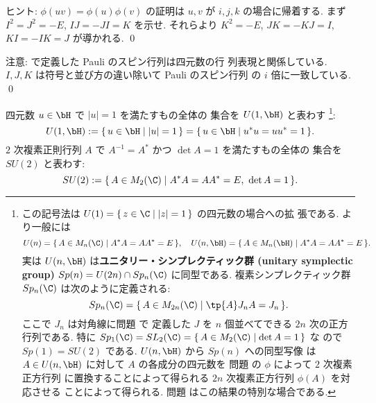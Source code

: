 \documentclass[12pt,twoside]{jarticle}
\begin{document}
\noindent
ヒント: $\phi(uv)=\phi(u)\phi(v)$ の証明は $u,v$ が $i,j,k$ の場合に帰着する. 
まず $I^2=J^2=-E$, $IJ=-JI=K$ を示せ.
それらより $K^2=-E$, $JK=-KJ=I$, $KI=-IK=J$ が導かれる.
\qed

\medskip
\noindent
注意:  で定義した Pauli のスピン行列は四元数の行
列表現と関係している.  $I,J,K$ は符号と並び方の違い除いて Pauli のスピン行列
の $i$ 倍に一致している.
\qed

\medskip

四元数 $u\in\bH$ で $|u|=1$ を満たすもの全体の
集合を $U(1,\bH)$ と表わす%
\footnote{この記号法は $U(1)=\{\,z\in\C\mid |z|=1 \,\}$ の四元数の場合への拡
  張である.  より一般には
  \begin{equation*}
    U(n) = \{\, A\in M_n(\C) \mid A^*A=AA^*=E \,\},
    \quad
    U(n,\bH) = \{\, A\in M_n(\bH) \mid A^*A=AA^*=E \,\}.
  \end{equation*}
  実は $U(n,\bH)$ は{\bf ユニタリー・シンプレクティック群 
  (unitary symplectic group)} $Sp(n)=U(2n)\cap Sp_n(\C)$ に同型である.
  複素シンプレクティック群 $Sp_n(\C)$ は次のように定義される:
  \begin{equation*}
    Sp_n(\C) = \{\, A\in M_{2n}(\C) \mid \tp{A}J_n A = J_n \,\}.
  \end{equation*}
  ここで $J_n$ は対角線に問題  で
  定義した $J$ を $n$ 個並べてできる $2n$ 次の正方行列である.
  特に $Sp_1(\C)=SL_2(\C)=\{\,A\in M_2(\C)\mid \det A = 1\,\}$ な
  ので $Sp(1)=SU(2)$ である. 
  $U(n,\bH)$ から $Sp(n)$ への同型写像
  は $A\in U(n,\bH)$ に対して $A$ の各成分の四元数を
  問題  の $\phi$ によって $2$ 次複素正方行列
  に置換することによって得られる $2n$ 次複素正方行列 $\phi(A)$ を対応させる
  ことによって得られる.
  問題  はこの結果の特別な場合である.}:
\begin{equation*}
  U(1,\bH) := \{\, u\in\bH \mid |u|=1 \,\}
  = \{\, u\in\bH \mid u^*u = uu^* = 1 \,\}.
\end{equation*}
$2$ 次複素正則行列 $A$ で $A^{-1}=A^*$ かつ $\det A=1$ を満たすもの全体の
集合を $SU(2)$ と表わす:
\begin{equation*}
  SU(2) := \{\, A\in M_2(\C) \mid A^*A=AA^*=E,\ \det A = 1 \,\}.
\end{equation*}
\end{document}
